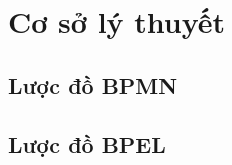 \section{Cơ sở lý thuyết}
    \subsection{Lược đồ BPMN}
    
    \subsection{Lược đồ BPEL}
    
    